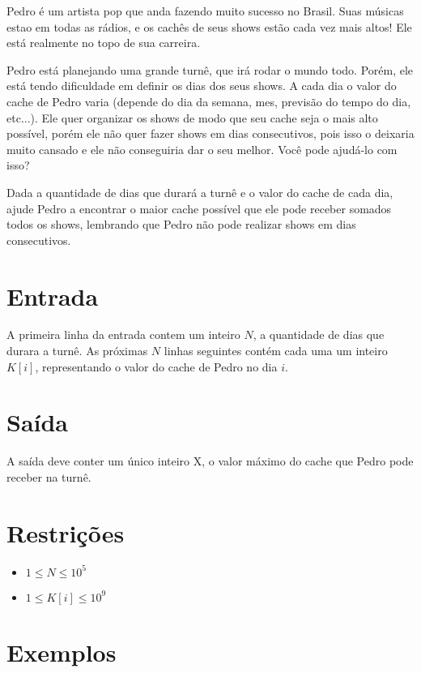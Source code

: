Pedro é um artista pop que anda fazendo muito sucesso no Brasil. Suas músicas estao em todas as rádios, e os cachês de seus shows estão cada vez mais altos! Ele está realmente no topo de sua carreira.

Pedro está planejando uma grande turnê, que irá rodar o mundo todo. Porém, ele está tendo dificuldade em definir os dias dos seus shows. A cada dia o valor do cache de Pedro varia (depende do dia da semana, mes, previsão do tempo do dia, etc...). Ele quer organizar os shows de modo que seu cache seja o mais alto possível, porém ele não quer fazer shows em dias consecutivos, pois isso o deixaria muito cansado e ele não conseguiria dar o seu melhor.  Você pode ajudá-lo com isso?

Dada a quantidade de dias que durará a turnê e o valor do cache de cada dia, ajude Pedro a encontrar o maior cache possível que ele pode receber somados todos os shows, lembrando que Pedro não pode realizar shows em dias consecutivos.

\section*{Entrada}

A primeira linha da entrada contem um inteiro $N$, a quantidade de dias que durara a turnê. As próximas $N$ linhas seguintes contém cada uma um inteiro $K[i]$, representando o valor do cache de Pedro no dia $i$.

\section*{Saída}

A saída deve conter um único inteiro X, o valor máximo do cache que Pedro pode receber na turnê.

\section*{Restrições}

\begin{itemize}
\item $1 \leq N \leq 10^5$
\item $1 \leq K[i] \leq 10^9$
\end{itemize}


\section*{Exemplos}

\exemplo
